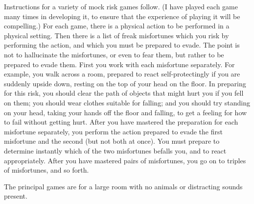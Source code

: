 Instructions for a variety of mock risk games follow. (I have played 
each game many times in developing it, to ensure that the experience of 
playing it will be compelling.) For each game, there is a physical action to be 
performed in a physical setting. Then there is a list of freak misfortunes 
which you risk by performing the action, and which you must be prepared 
to evade. The point is not to hallucinate the misfortunes, or even to fear 
them, but rather to be prepared to evade them. First you work with each 
misfortune separately. For example, you walk across a room, prepared to 
react self-protectingly if you are suddenly upside down, resting on the top of 
your head on the floor. In preparing for this risk, you should clear the path 
of objects that might hurt you if you fell on them; you should wear clothes 
suitable for falling; and you should try standing on your head, taking your 
hands off the floor and falling, to get a feeling for how to fail without 
getting hurt. After you have mastered the preparation for each misfortune 
separately, you perform the action prepared to evade the first misfortune 
and the second (but not both at once). You must prepare to determine 
instantly which of the two misfortunes befalls you, and to react 
appropriately. After you have mastered pairs of misfortunes, you go on to 
triples of misfortunes, and so forth. 

The principal games are for a large room with no animals or distracting 
sounds present. 


